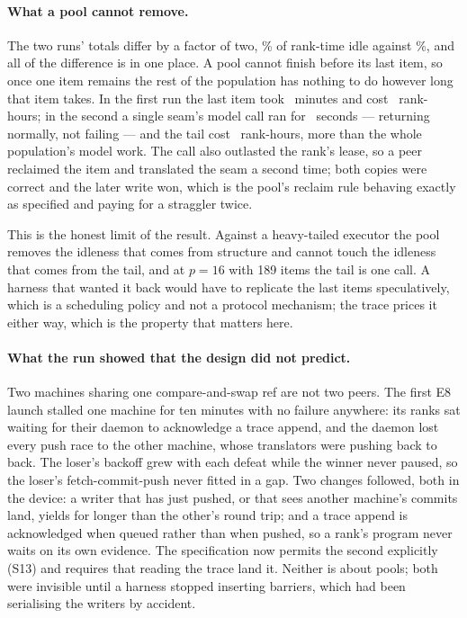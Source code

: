 \paragraph{What a pool cannot remove.} The two runs' totals differ by a factor of
two, \eEightIdleShare\% of rank-time idle against \eEightBIdleShare\%, and all of
the difference is in one place. A pool cannot finish before its last item, so
once one item remains the rest of the population has nothing to do however long
that item takes. In the first run the last item took \eEightTailMin\ minutes and
cost \eEightWaitTailH\ rank-hours; in the second a single seam's model call ran
for \eEightBSlowestCallS\ seconds --- returning normally, not failing --- and the
tail cost \eEightBWaitTailH\ rank-hours, more than the whole population's model
work. The call also outlasted the rank's lease, so a peer reclaimed the item and
translated the seam a second time; both copies were correct and the later write
won, which is the pool's reclaim rule behaving exactly as specified and paying
for a straggler twice.

This is the honest limit of the result. Against a heavy-tailed executor the pool
removes the idleness that comes from structure and cannot touch the idleness that
comes from the tail, and at $p=16$ with 189 items the tail is one call. A harness
that wanted it back would have to replicate the last items speculatively, which
is a scheduling policy and not a protocol mechanism; the trace prices it either
way, which is the property that matters here.

\paragraph{What the run showed that the design did not predict.} Two machines
sharing one compare-and-swap ref are not two peers. The first E8 launch stalled
one machine for ten minutes with no failure anywhere: its ranks sat waiting for
their daemon to acknowledge a trace append, and the daemon lost every push race
to the other machine, whose translators were pushing back to back. The loser's
backoff grew with each defeat while the winner never paused, so the loser's
fetch-commit-push never fitted in a gap. Two changes followed, both in the
device: a writer that has just pushed, or that sees another machine's commits
land, yields for longer than the other's round trip; and a trace append is
acknowledged when queued rather than when pushed, so a rank's program never
waits on its own evidence. The specification now permits the second explicitly
(S13) and requires that reading the trace land it. Neither is about pools; both
were invisible until a harness stopped inserting barriers, which had been
serialising the writers by accident.

